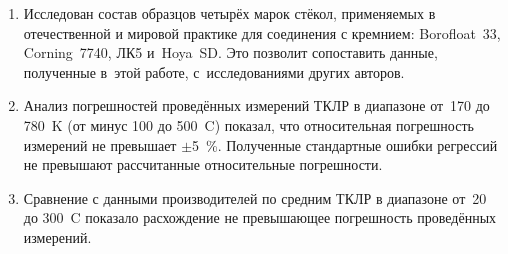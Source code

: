 \begin{enumerate}
    \item Исследован состав образцов четырёх марок стёкол, применяемых в
    отечественной и мировой практике для соединения с кремнием: Borofloat~33,
    Corning~7740, ЛК5 и~Hoya~SD.
    Это позволит сопоставить данные, полученные в~этой работе,
    с~исследованиями других авторов.
    \item Анализ погрешностей проведённых измерений ТКЛР в
    диапазоне от~170 до 780~K (от минус 100 до
    500~{\textdegree}C) показал, что относительная погрешность
    измерений не превышает ${\pm}$5~\%.
    Полученные стандартные ошибки регрессий не превышают
    рассчитанные относительные погрешности.
    \item Сравнение с данными производителей по средним ТКЛР
    в диапазоне от~20 до 300~{\textdegree}C показало расхождение
    не превышающее погрешность проведённых измерений.
\end{enumerate}
